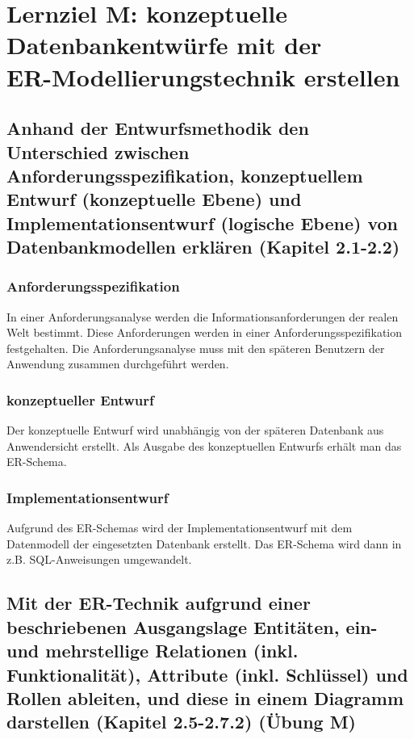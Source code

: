 \section{Lernziel M: konzeptuelle Datenbankentwürfe mit der \\ ER-Modellierungstechnik erstellen}

\subsection{Anhand der Entwurfsmethodik den Unterschied zwischen
Anforderungsspezifikation, konzeptuellem Entwurf (konzeptuelle Ebene)
und Implementationsentwurf (logische Ebene) von Datenbankmodellen
erklären (Kapitel 2.1-2.2)}

\subsubsection{Anforderungsspezifikation}

In einer Anforderungsanalyse werden die Informationsanforderungen der realen Welt bestimmt. Diese Anforderungen werden in einer Anforderungsspezifikation festgehalten. Die Anforderungsanalyse muss mit den späteren Benutzern der Anwendung zusammen durchgeführt werden.

\subsubsection{konzeptueller Entwurf}

Der konzeptuelle Entwurf wird unabhängig von der späteren Datenbank aus Anwendersicht erstellt. Als Ausgabe des konzeptuellen Entwurfs erhält man das ER-Schema.

\subsubsection{Implementationsentwurf}

Aufgrund des ER-Schemas wird der Implementationsentwurf mit dem Datenmodell der eingesetzten Datenbank erstellt. Das ER-Schema wird dann in z.B. SQL-Anweisungen umgewandelt.

\subsection{Mit der ER-Technik aufgrund einer beschriebenen Ausgangslage Entitäten, ein- und mehrstellige Relationen (inkl. Funktionalität), Attribute (inkl. Schlüssel) und Rollen ableiten, und diese in einem Diagramm darstellen (Kapitel 2.5-2.7.2) (Übung M)}



